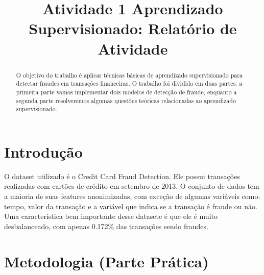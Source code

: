 \documentclass[conference]{IEEEtran}
\begin{document}

\title{Atividade 1 Aprendizado Supervisionado: Relatório de Atividade}

\author{
}

\maketitle
\begin{abstract}
O objetivo do trabalho é aplicar técnicas básicas de aprendizado supervisionado para detectar fraudes em transações financeiras. O trabalho foi dividido em duas partes: a primeira parte vamos implementar dois modelos de detecção de fraude, enquanto a segunda parte resolveremos algumas questões teóricas relacionadas ao aprendizado supervisionado.
\end{abstract}

\section{Introdução}
\label{sec:introducao}
  O dataset utilizado é o Credit Card Fraud Detection. Ele possui transações realizadas com cartões de crédito em setembro de 2013. O conjunto de dados tem a maioria de suas features anonimizadas, com exceção de algumas variáveis como: tempo, valor da transação e a variável que indica se a transação é fraude ou não. Uma característica bem importante desse datasete é que ele é muito desbalanceado, com apenas 0.172\% das transações sendo fraudes. 

\section{Metodologia (Parte Prática)}
\label{sec:metodologia}
\end{document}
